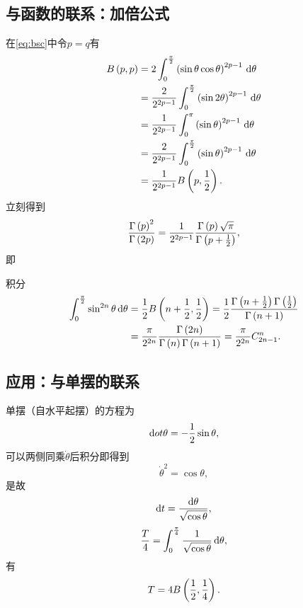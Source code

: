 \documentclass[UTF-8]{ctexart}
\begin{document}
  \subsection{与\titlegamma 函数的联系：加倍公式}
  在\ref{eq:bsc}中令$p=q$有
  \begin{align*}
    B\left(p,p\right) &= 2 \int_0^{\frac{\pi}{2}} \left(\sin\theta\cos\theta\right)^{2p-1} \,\mathrm{d} \theta \\
    &= \frac{2}{2^{2p-1}}\int_0^{\frac{\pi}{2}} \left(\sin2\theta\right)^{2p-1} \,\mathrm{d} \theta \\
    &= \frac{1}{2^{2p-1}}\int_0^{\pi} \left(\sin\theta\right)^{2p-1} \,\mathrm{d} \theta \\
    &= \frac{2}{2^{2p-1}}\int_0^{\frac{\pi}{2}} \left(\sin\theta\right)^{2p-1} \,\mathrm{d} \theta \\
    &=\frac{1}{2^{2p-1}}B\left(p,\frac{1}{2}\right).
  \end{align*}
  立刻得到
  \[ \frac{\Gamma\left(p\right)^2}{\Gamma\left(2p\right)} = \frac{1}{2^{2p-1}}\frac{\Gamma\left(p\right)\sqrt{\pi}}{\Gamma\left(p+\frac{1}{2}\right)}, \]
  即
  \begin{ex}
  \label{ex:sin2n}
  积分
  \begin{align*}
   \int_0^{\frac{\pi}{2}} \sin^{2n}\theta \,\mathrm{d} \theta &= \frac{1}{2} B\left(n+\frac{1}{2},\frac{1}{2}\right) = \frac{1}{2}\frac{\Gamma\left(n+\frac{1}{2}\right)\Gamma\left(\frac{1}{2}\right)}{\Gamma\left(n+1\right)}\\
   &= \frac{\pi}{2^{2n}}\frac{\Gamma\left(2n\right)}{\Gamma\left(n\right)\Gamma\left(n+1\right)} = \frac{\pi}{2^{2n}}C_{2n-1}^{n}.
  \end{align*}
  \end{ex}
  \subsection{应用：与单摆的联系}
  \label{sssec:gamma2pd}
  单摆（自水平起摆）的方程为
  \[ \mathrm{d}ot{\theta} = -\frac{1}{2}\sin\theta, \]
  可以两侧同乘$\dot{\theta}$后积分即得到
  \[ \dot{\theta}^2 = \cos{\theta}, \]
  是故
  \[ \mathrm{d} t = \frac{\mathrm{d} \theta}{\sqrt{\cos\theta}}, \]
  \[ \frac{T}{4} = \int_0^{\frac{\pi}{4}} \frac{1}{\sqrt{\cos\theta}} \,\mathrm{d} \theta, \]
  有
  \[ T = 4B\left(\frac{1}{2}, \frac{1}{4}\right). \]
\end{document}
